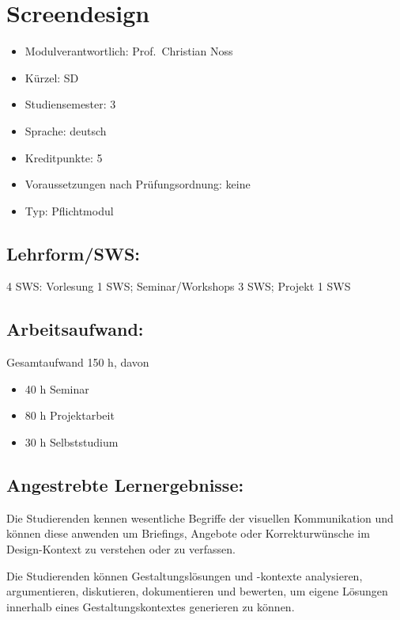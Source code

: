 \chapter{Screendesign}\label{screendesign}

\begin{itemize}
\tightlist
\item
  Modulverantwortlich: Prof.~Christian Noss
\item
  Kürzel: SD
\item
  Studiensemester: 3
\item
  Sprache: deutsch
\item
  Kreditpunkte: 5
\item
  Voraussetzungen nach Prüfungsordnung: keine
\item
  Typ: Pflichtmodul
\end{itemize}

\section*{Lehrform/SWS:}\label{lehrformsws-21}

4 SWS: Vorlesung 1 SWS; Seminar/Workshops 3 SWS; Projekt 1 SWS

\section*{Arbeitsaufwand:}\label{arbeitsaufwand-20}

Gesamtaufwand 150 h, davon

\begin{itemize}
\tightlist
\item
  40 h Seminar
\item
  80 h Projektarbeit
\item
  30 h Selbststudium
\end{itemize}

\section*{Angestrebte
Lernergebnisse:}\label{angestrebte-lernergebnisse-21}

Die Studierenden kennen wesentliche Begriffe der visuellen Kommunikation
und können diese anwenden um Briefings, Angebote oder Korrekturwünsche
im Design-Kontext zu verstehen oder zu verfassen.

Die Studierenden können Gestaltungslösungen und -kontexte analysieren,
argumentieren, diskutieren, dokumentieren und bewerten, um eigene
Lösungen innerhalb eines Gestaltungskontextes generieren zu können.

